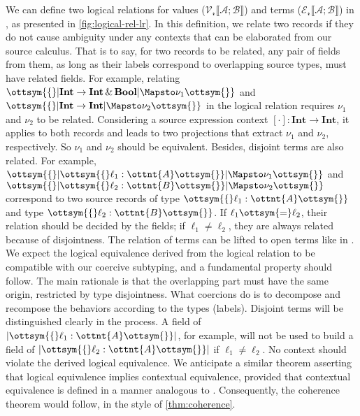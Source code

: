 We can define two logical relations for values
($\mathcal{V_r} \llbracket \mathcal{A} ; \mathcal{B} \rrbracket$) and terms
($\mathcal{E_r} \llbracket \mathcal{A}; \mathcal{B} \rrbracket$) in \lambdar, as presented
in \autoref{fig:logical-rel-lr}. In this definition, we relate two records if
they do not cause ambiguity under any contexts that can be elaborated from our
source calculus. That is to say, for two records to be related, any pair of
fields from them, as long as their labels correspond to overlapping source
types, must have related fields. For example, relating
$ \ottsym{\{}   |  \mathbf{Int}   \rightarrow   \mathbf{Int}   \, {\&} \,   \mathbf{Bool}  |   \Mapsto  \nu_{{\mathrm{1}}}  \ottsym{\}} $ and $\ottsym{\{}   |  \mathbf{Int}   \rightarrow   \mathbf{Int}  |   \Mapsto  \nu_{{\mathrm{2}}}  \ottsym{\}}$
in the logical relation requires $\nu_{{\mathrm{1}}}$ and $\nu_{{\mathrm{2}}}$ to be related.
Considering a source expression context $ [ \cdot ]:  \mathbf{Int}   \rightarrow   \mathbf{Int}  $, it applies
to both records and leads to two projections that extract $\nu_{{\mathrm{1}}}$ and
$\nu_{{\mathrm{2}}}$, respectively. So $\nu_{{\mathrm{1}}}$ and $\nu_{{\mathrm{2}}}$ should be equivalent.
Besides, disjoint terms are also related. For example,
$ \ottsym{\{}   | \ottsym{\{}  \ell_{{\mathrm{1}}}  :  \ottnt{A}  \ottsym{\}} |   \Mapsto  \nu_{{\mathrm{1}}}  \ottsym{\}} $ and $ \ottsym{\{}   | \ottsym{\{}  \ell_{{\mathrm{2}}}  :  \ottnt{B}  \ottsym{\}} |   \Mapsto  \nu_{{\mathrm{2}}}  \ottsym{\}} $ correspond
to two source records of type $ \ottsym{\{}  \ell_{{\mathrm{1}}}  :  \ottnt{A}  \ottsym{\}} $ and type $ \ottsym{\{}  \ell_{{\mathrm{2}}}  :  \ottnt{B}  \ottsym{\}} $. If
$\ell_{{\mathrm{1}}}  \ottsym{=}  \ell_{{\mathrm{2}}}$, their relation should be decided by the fields; if
$ \ell_{{\mathrm{1}}}  \neq  \ell_{{\mathrm{2}}} $, they are always related because of disjointness. The relation of
terms can be lifted to open terms like in \necolus. We expect the logical
equivalence derived from the logical relation to be compatible with our coercive
subtyping, and a fundamental property should follow. The main rationale is that
the overlapping part must have the same origin, restricted by type disjointness.
What coercions do is to decompose and recompose the behaviors according to the
types (labels). Disjoint terms will be distinguished clearly in the process. A
field of $  | \ottsym{\{}  \ell_{{\mathrm{1}}}  :  \ottnt{A}  \ottsym{\}} | $, for example, will not be used to build a field of
$  | \ottsym{\{}  \ell_{{\mathrm{2}}}  :  \ottnt{A}  \ottsym{\}} | $ if $ \ell_{{\mathrm{1}}}  \neq  \ell_{{\mathrm{2}}} $. No \lambdaiplus context should violate
the derived logical equivalence. We anticipate a similar theorem asserting that
logical equivalence implies contextual equivalence, provided that contextual
equivalence is defined in a manner analogous to \necolus. Consequently, the
coherence theorem would follow, in the style of \autoref{thm:coherence}.
